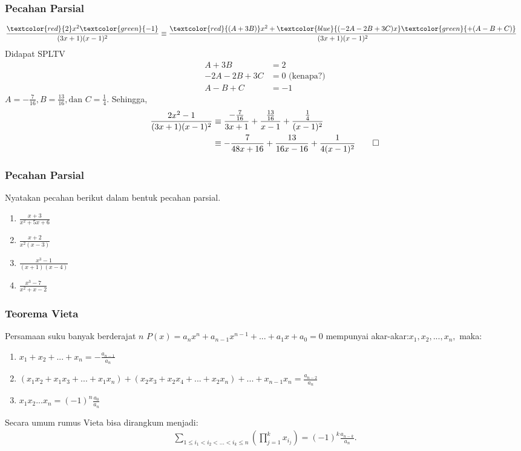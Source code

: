 \documentclass[11pt]{beamer}
\begin{document}
	\begin{frame}
		\frametitle{Pecahan Parsial}
		\begin{align*}
			\frac{\textcolor{red}{2}x^2\textcolor{green}{-1}}{(3x+1)(x-1)^2}&\equiv
			\frac{\textcolor{red}{(A+3B)}x^2+\textcolor{blue}{(-2A-2B+3C)x}\textcolor{green}{+(A-B+C)}}{(3x+1)(x-1)^2}
		\end{align*}	
		Didapat SPLTV
		\begin{align*}
			A+3B&=2\\
			-2A-2B+3C&=0 \text{ (kenapa?)}\\
			A-B+C&=-1
		\end{align*}	
		$A=-\frac{7}{16}, B=\frac{13}{16}, \text{dan } C=\frac{1}{4}$. Sehingga, 
		\begin{align*}
			\frac{2x^2-1}{(3x+1)(x-1)^2}&\equiv \frac{-\frac{7}{16}}{3x+1}+\frac{\frac{13}{16}}{x-1}+\frac{\frac{1}{4}}{(x-1)^2}\\
			&\equiv -\frac{7}{48x+16}+\frac{13}{16x-16}+\frac{1}{4(x-1)^2}
		\qed
		\end{align*}
	\end{frame}
	
	\begin{frame}
		\frametitle{Pecahan Parsial}
		Nyatakan pecahan berikut dalam bentuk pecahan parsial.
		\begin{enumerate}
			\item $\frac{x+3}{x^2+5x+6}$
			\item $\frac{x+2}{x^2(x-3)}$
			\item $\frac{x^3-1}{(x+1)(x-4)}$
			\item $\frac{x^3-7}{x^2+x-2}$
		\end{enumerate}
	\end{frame}
	
	\begin{frame}
		\frametitle{Teorema Vieta}
	Persamaan suku banyak berderajat $n$ $P(x)=a_nx^n+a_{n-1}x^{n-1}+...+a_1x+a_0=0$ mempunyai akar-akar:$x_1, x_2, ..., x_n,$ maka:
		\begin{enumerate}
			\item $x_1+x_2+...+x_n=-\frac{a_{n-1}}{a_n}$
			\item $(x_1x_2+x_1x_3+...+x_1x_n)+(x_2x_3+x_2x_4+...+x_2x_n)+...+x_{n-1}x_n=\frac{a_{n-2}}{a_n}$
			\item $x_1x_2...x_n=(-1)^n
			\frac{a_0}{a_n}$ 
		\end{enumerate}
		Secara umum rumus Vieta bisa dirangkum menjadi:
		\begin{align*}
			\sum_{1\leq i_1< i_2<...<i_k\leq n}^{}\left(\prod_{j=1}^{k}x_{i_{j}}\right)=\left(-1\right)^k\frac{a_{n-k}}{a_n}.
		\end{align*}
	\end{frame}
	
\end{document}
